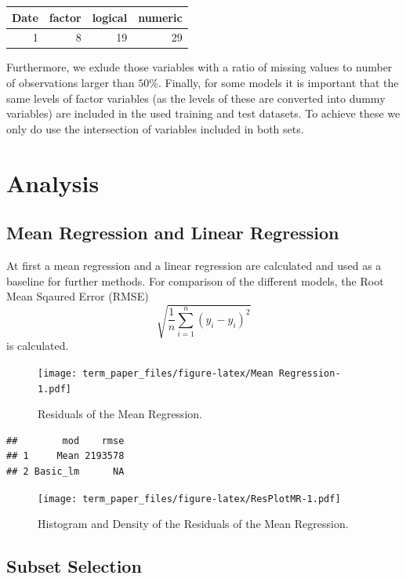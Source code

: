 \documentclass[11pt,]{article}
\begin{document}
\begin{longtable}[]{@{}rrrr@{}}
\toprule
Date & factor & logical & numeric\tabularnewline
\midrule
\endhead
1 & 8 & 19 & 29\tabularnewline
\bottomrule
\end{longtable}

Furthermore, we exlude those variables with a ratio of missing values to
number of observations larger than \(50\%\). Finally, for some models it
is important that the same levels of factor variables (as the levels of
these are converted into dummy variables) are included in the used
training and test datasets. To achieve these we only do use the
intersection of variables included in both sets.

\hypertarget{analysis}{%
\section{Analysis}\label{analysis}}

\hypertarget{mean-regression-and-linear-regression}{%
\subsection{Mean Regression and Linear
Regression}\label{mean-regression-and-linear-regression}}

At first a mean regression and a linear regression are calculated and
used as a baseline for further methods. For comparison of the different
models, the Root Mean Sqaured Error (RMSE)
\[\sqrt{\frac{1}{n}\sum_{i = 1}^{n}\left(y_i-\hat{y}_i\right)^2}\] is
calculated.

\begin{figure}
\centering
\texttt{[image: term\_paper\_files/figure-latex/Mean Regression-1.pdf]}
\caption{Residuals of the Mean Regression.}
\end{figure}

\begin{verbatim}
##        mod    rmse
## 1     Mean 2193578
## 2 Basic_lm      NA
\end{verbatim}

\begin{figure}
\centering
\texttt{[image: term\_paper\_files/figure-latex/ResPlotMR-1.pdf]}
\caption{Histogram and Density of the Residuals of the Mean Regression.}
\end{figure}

\hypertarget{subset-selection}{%
\subsection{Subset Selection}\label{subset-selection}}
\end{document}
